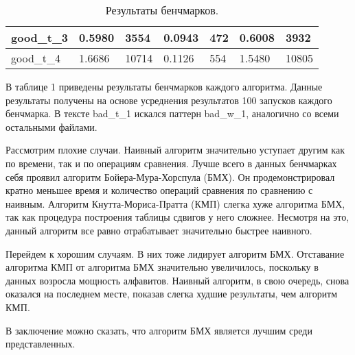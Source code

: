 \documentclass{article}
\begin{document}
\begin{table}[!h]
\begin{center}
\begin{tabular}{ | m{4.1em} | m{4.5em} | m{4.5em} | m{4.5em} | m{4.5em} | m{4.5em} | m{4.5em}| }
            \hline
            good\_t\_3 & 0.5980                                     & 3554                                                    & 0.0943                                                  & 472       & 0.6008    & 3932      \\
            \hline
            good\_t\_4 & 1.6686                                     & 10714                                                   & 0.1126                                                  & 554       & 1.5480    & 10805     \\
            \hline
        \end{tabular}
        \caption{Результаты бенчмарков.}
    \end{center}
\end{table}

В таблице 1 приведены результаты бенчмарков каждого алгоритма.
Данные результаты получены на основе усреднения результатов 100 запусков каждого бенчмарка.
В тексте bad\_t\_1 искался паттерн bad\_w\_1, аналогично со всеми остальными файлами.

Рассмотрим плохие случаи. Наивный алгоритм значительно уступает другим как по времени,
так и по операциям сравнения.
Лучше всего в данных бенчмарках себя проявил алгоритм
Бойера-Мура-Хорспула (БМХ). Он продемонстрировал кратно меньшее время и
количество операций сравнения по сравнению с наивным.
Алгоритм Кнутта-Мориса-Пратта (КМП) слегка хуже алгоритма БМХ,
так как процедура построения таблицы сдвигов у него сложнее. Несмотря на это,
данный алгоритм все равно отрабатывает значительно быстрее наивного.

Перейдем к хорошим случаям. В них тоже лидирует алгоритм БМХ. Отставание алгоритма КМП
от алгоритма БМХ значительно увеличилось, поскольку в данных возросла мощность алфавитов.
Наивный алгоритм, в свою очередь,
снова оказался на последнем месте, показав слегка худшие результаты,
чем алгоритм КМП.

В заключение можно сказать, что алгоритм БМХ является лучшим среди представленных.
\end{document}
